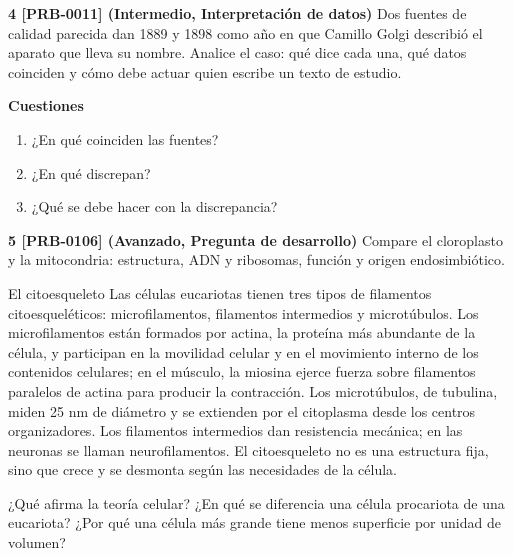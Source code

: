 \documentclass{book}
\begin{document}
\begin{tcolorbox}[title={Ejercicios}, studiumworked, breakable]
\noindent\textbf{4 [PRB-0011] (Intermedio, Interpretación de datos)}
Dos fuentes de calidad parecida dan 1889 y 1898 como año en que Camillo Golgi describió el aparato que lleva su nombre. Analice el caso: qué dice cada una, qué datos coinciden y cómo debe actuar quien escribe un texto de estudio.


\noindent\textbf{Cuestiones}
\begin{enumerate}
\item ¿En qué coinciden las fuentes?
\item ¿En qué discrepan?
\item ¿Qué se debe hacer con la discrepancia?
\end{enumerate}

\noindent\textbf{5 [PRB-0106] (Avanzado, Pregunta de desarrollo)}
Compare el cloroplasto y la mitocondria: estructura, ADN y ribosomas, función y origen endosimbiótico.

\end{tcolorbox}

\begin{tcolorbox}[title={Autoficha}, studiumcheck, breakable]

El citoesqueleto
Las células eucariotas tienen tres tipos de filamentos citoesqueléticos: microfilamentos, filamentos intermedios y microtúbulos. Los microfilamentos están formados por actina, la proteína más abundante de la célula, y participan en la movilidad celular y en el movimiento interno de los contenidos celulares; en el músculo, la miosina ejerce fuerza sobre filamentos paralelos de actina para producir la contracción. Los microtúbulos, de tubulina, miden 25 nm de diámetro y se extienden por el citoplasma desde los centros organizadores. Los filamentos intermedios dan resistencia mecánica; en las neuronas se llaman neurofilamentos. El citoesqueleto no es una estructura fija, sino que crece y se desmonta según las necesidades de la célula.


¿Qué afirma la teoría celular? ¿En qué se diferencia una célula procariota de una eucariota? ¿Por qué una célula más grande tiene menos superficie por unidad de volumen?

\end{tcolorbox}
\end{document}
